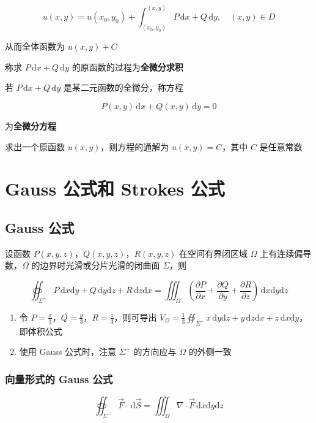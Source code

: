 \documentclass[lang = zh , final , oneside , openany , titlepage , zihao = -4 , linespread = 1.3 , baselineskip = false , cjk-font = windows , text-font = newtx , math-font = newtx , math-style = TeX]{sjtureport}
\begin{document}
\[u(x,y) = u(x_0,y_0) + \int_{(x_0,y_0)}^{(x,y)} P\,\mathrm{d}x +Q\,\mathrm{d}y,\quad (x,y)\in D\]

从而全体函数为 \(u(x,y) + C\)

称求 \(P\,\mathrm{d}x +Q\,\mathrm{d}y\)
的原函数的过程为\textbf{全微分求积}

若 \(P\,\mathrm{d}x +Q\,\mathrm{d}y\) 是某二元函数的全微分，称方程

\[P(x,y)\,\mathrm{d}x +Q(x,y)\,\mathrm{d}y = 0\]

为\textbf{全微分方程}

求出一个原函数 \(u(x,y)\)，则方程的通解为 \(u(x,y) = C\)，其中 \(C\)
是任意常数

\section{Gauss 公式和 Strokes 公式}

\subsection{Gauss 公式}

\begin{theorem}
    设函数 \(P(x,y,z)\)，\(Q(x,y,z)\)，\(R(x,y,z)\) 在空间有界闭区域
\(\Omega\) 上有连续偏导数，\(\Omega\) 的边界时光滑或分片光滑的闭曲面
\(\Sigma\)，则

\[\oiint_{\Sigma^+} P\,\mathrm{d}x\mathrm{d}y + Q\,\mathrm{d}y\mathrm{d}z + R\,\mathrm{d}z\mathrm{d}x = \iiint_\Omega \left(\frac{\partial P}{\partial x} + \frac{\partial Q}{\partial y} + \frac{\partial R}{\partial z}\right)\,\mathrm{d}x\mathrm{d}y\mathrm{d}z\]
\end{theorem}

\begin{enumerate}
\item
  令 \(P=\frac{x}{3}\)，\(Q=\frac{y}{3}\)，\(R=\frac{z}{3}\)，则可导出
  \(\displaystyle V_\Omega = \frac{1}{3}\oiint_{\Sigma^+} x\,\mathrm{d}y\mathrm{d}z + y\,\mathrm{d}z\mathrm{d}x + z\,\mathrm{d}x\mathrm{d}y\)，即体积公式
\item
  使用 Gauss 公式时，注意 \(\Sigma^+\) 的方向应与 \(\Omega\) 的外侧一致
\end{enumerate}

\subsubsection{向量形式的 Gauss 公式}

\[\oiint_{\Sigma^+} \vec{F}\cdot\,\mathrm{d}\vec{S} = \iiint_\Omega \nabla\cdot\vec{F}\,\mathrm{d}x\mathrm{d}y\mathrm{d}z\]
\end{document}
